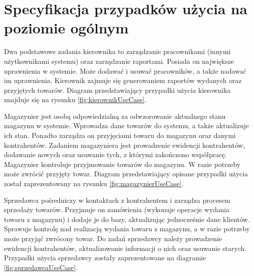 \section{Specyfikacja przypadków użycia na poziomie ogólnym}

Dwa podstawowe zadania kierownika to zarządzanie pracownikami (innymi
użytkownikami systemu) oraz zarządzanie raportami. Posiada on
największe uprawnienia w systemie. Może dodawać i usuwać pracowników,
a także nadawać im uprawnienia. Kierownik zajmuje się generowaniem
raportów wydanych oraz przyjętych towarów.  Diagram przedstawiający
przypadki użycia kierownika znajduje się na rysunku
\ref{fig:kierownikUseCase}.

Magazynier jest osobą odpowiedzialną za odwzorowanie aktualnego stanu
magazynu w systemie. Wprowadza dane towarów do systemu, a także
aktualizuje ich stan. Ponadto zarządza on przyjęciami towaru do
magazynu oraz danymi kontrahentów.  Zadaniem magazyniera jest
prowadzenie ewidencji kontrahentów, dodawanie nowych oraz usuwanie
tych, z którymi zakończono współpracę. Magazynier kontroluje
przyjmowanie towarów do magazynu.  W razie potrzeby może zwrócić
przyjęty towar. Diagram przedstawiający opisane przypadki użycia
został zaprezentowany na rysunku \ref{fig:magazynierUseCase}.

Sprzedawca pośredniczy w kontaktach z kontrahentem i zarządza procesem
sprzedaży towarów. Przyjmuje on zamówienia (wykonuje operacje wydania
towaru z magazynu) i dodaje je do bazy, aktualizując jednocześnie dane
klientów. Sprawuje kontrolę nad realizacją wydania towaru z magazynu,
a w razie potrzeby może przyjąć zwrócony towar. Do zadań sprzedawcy
należy prowadzenie ewidencji kontrahentów, aktualizowanie informacji o
nich oraz usuwanie starych. Przypadki użycia sprzedawcy zostały
zaprezentowane na diagramie \ref{fig:sprzedawcaUseCase}.
